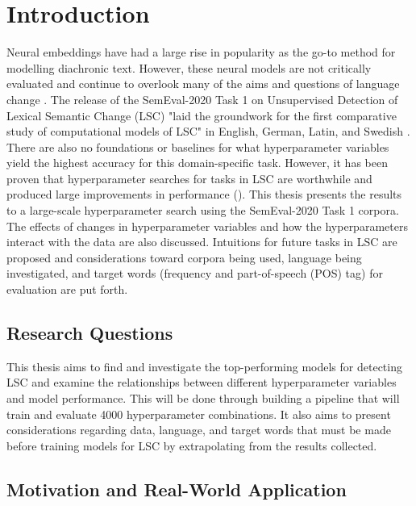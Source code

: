 

\section{Introduction}
\label{sec:intro}

Neural embeddings have had a large rise in popularity as the go-to method for modelling diachronic text. However, these neural models are not critically evaluated and continue to overlook many of the aims and questions of language change \citep{hengchen2021challenges}. The release of the SemEval-2020 Task 1 on Unsupervised Detection of Lexical Semantic Change (LSC) \citep{schlechtweg-etal-2020-semeval} "laid the groundwork for the first comparative study of computational models of LSC" in English, German, Latin, and Swedish \citep{hengchen2021SBXrushifteval}. There are also no foundations or baselines for what hyperparameter variables yield the highest accuracy for this domain-specific task. However, it has been proven that hyperparameter searches for tasks in LSC are worthwhile and produced large improvements in performance (\citet{kaiser-etal-2020-ims, hengchen2021SBXrushifteval}). This thesis presents the results to a large-scale hyperparameter search using the SemEval-2020 Task 1 corpora. The effects of changes in hyperparameter variables and how the hyperparameters interact with the data are also discussed. Intuitions for future tasks in LSC are proposed and considerations toward corpora being used, language being investigated, and target words (frequency and part-of-speech (POS) tag) for evaluation are put forth. 


\subsection{Research Questions}
This thesis aims to find and investigate the top-performing models for detecting LSC and examine the relationships between different hyperparameter variables and model performance. This will be done through building a pipeline that will train and evaluate 4000 hyperparameter combinations. It also aims to present considerations regarding data, language, and target words that must be made before training models for LSC by extrapolating from the results collected. 


\subsection{Motivation and Real-World Application}

